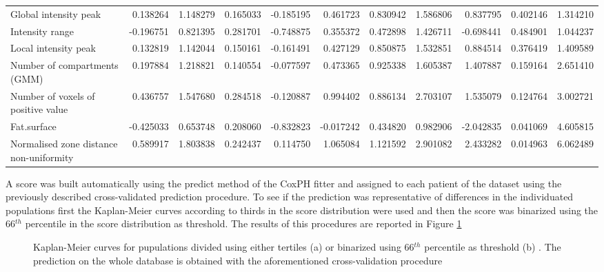 \begin{table}
\begin{adjustbox}{width=0.7\paperheight, angle=90}
\begin{tabular}{|lrrrrrrrrrr|}
Global intensity peak                   &  0.138264 &   1.148279 &  0.165033 &       -0.185195 &        0.461723 &             0.830942 &             1.586806 &  0.837795 &  0.402146 &  1.314210 \\
Intensity range                         & -0.196751 &   0.821395 &  0.281701 &       -0.748875 &        0.355372 &             0.472898 &             1.426711 & -0.698441 &  0.484901 &  1.044237 \\
Local intensity peak                    &  0.132819 &   1.142044 &  0.150161 &       -0.161491 &        0.427129 &             0.850875 &             1.532851 &  0.884514 &  0.376419 &  1.409589 \\
Number of compartments (GMM)            &  0.197884 &   1.218821 &  0.140554 &       -0.077597 &        0.473365 &             0.925338 &             1.605387 &  1.407887 &  0.159164 &  2.651410 \\
Number of voxels of positive value      &  0.436757 &   1.547680 &  0.284518 &       -0.120887 &        0.994402 &             0.886134 &             2.703107 &  1.535079 &  0.124764 &  3.002721 \\
Fat.surface                             & -0.425033 &   0.653748 &  0.208060 &       -0.832823 &       -0.017242 &             0.434820 &             0.982906 & -2.042835 &  0.041069 &  4.605815 \\
Normalised zone distance non-uniformity &  0.589917 &   1.803838 &  0.242437 &        0.114750 &        1.065084 &             1.121592 &             2.901082 &  2.433282 &  0.014963 &  6.062489 \\
\bottomrule
\end{tabular}
\end{adjustbox}
\end{table}

A score was built automatically using the predict method of the CoxPH fitter and assigned to each patient of the dataset using the previously described cross-validated prediction procedure.
To see if the prediction was representative of differences in the individuated populations first the Kaplan-Meier curves according to thirds in the score distribution were used and then the score was binarized using the 66$^{th}$ percentile in the score distribution as threshold.
The results of this procedures are reported in Figure \ref{fig:KmCoxScore}

\begin{figure}[H]
\centering
	\newline
        \caption{Kaplan-Meier curves for pupulations divided using either tertiles (a) or binarized using 66$^{th}$ percentile as threshold (b) . The prediction on the whole database is obtained with the aforementioned cross-validation procedure }\label{fig:KmCoxScore}
\end{figure}

